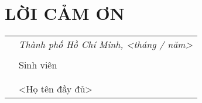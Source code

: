 \chapter*{LỜI CẢM ƠN}
\vspace*{1.5ex}


{
\begin{table}[ht]
\centering
\begin{tabular}{>{\centering}m{}>{\centering\arraybackslash}m{}}
 & \textit{Thành phố Hồ Chí Minh, <tháng / năm>} \\ & \\
 & Sinh viên \\
 & \\ &  \\
 & <Họ tên đầy đủ>
\end{tabular}
\end{table}
}